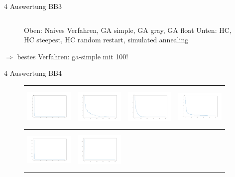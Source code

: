 \documentclass{ocbeameruni}
\begin{document}
\begin{frame}{4 Auswertung BB3}
\begin{center}
\begin{figure}
\begin{tabular}{|c|c|c|c|}
    \end{tabular}
    \caption{Oben: Naives Verfahren, GA simple, GA gray, GA float \hspace{\textwidth}Unten: HC, HC steepest, HC random restart, simulated annealing}
    \end{figure}
    $\Rightarrow$ bestes Verfahren: ga-simple mit 100!
    \end{center}
\end{frame}

\begin{frame}{4 Auswertung BB4}
    \begin{center}
    \begin{figure}
    \begin{tabular}{|c|c|c|c|} 
      \hline
      \includegraphics[width=23mm, height=20mm]{plots/bb4_naive.png} 
    & \includegraphics[width=23mm, height=20mm]{plots/bb4_ga_simple.png} 
    & \includegraphics[width=23mm, height=20mm]{plots/bb4_ga_gray.png}
    & \includegraphics[width=23mm, height=20mm]{plots/bb4_ga_float.png} \\ \hline
      \includegraphics[width=23mm, height=20mm]{plots/bb4_hc.png} 
    & \includegraphics[width=23mm, height=20mm]{plots/bb4_hc_sa.png} 

\end{tabular}
\end{figure}
\end{center}
\end{frame}
\end{document}
